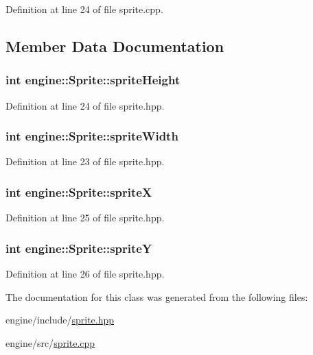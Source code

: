 Definition at line 24 of file sprite.\+cpp.



\subsection{Member Data Documentation}
\subsubsection[{\texorpdfstring{sprite\+Height}{spriteHeight}}]{\setlength{\rightskip}{0pt plus 5cm}int engine\+::\+Sprite\+::sprite\+Height}\hypertarget{classengine_1_1_sprite_a535447d266fb4582b772f5277ae02f3a}{}\label{classengine_1_1_sprite_a535447d266fb4582b772f5277ae02f3a}


Definition at line 24 of file sprite.\+hpp.

\subsubsection[{\texorpdfstring{sprite\+Width}{spriteWidth}}]{\setlength{\rightskip}{0pt plus 5cm}int engine\+::\+Sprite\+::sprite\+Width}\hypertarget{classengine_1_1_sprite_a6bf325695b8242a3e3a5844a13ca4405}{}\label{classengine_1_1_sprite_a6bf325695b8242a3e3a5844a13ca4405}


Definition at line 23 of file sprite.\+hpp.

\subsubsection[{\texorpdfstring{spriteX}{spriteX}}]{\setlength{\rightskip}{0pt plus 5cm}int engine\+::\+Sprite\+::spriteX}\hypertarget{classengine_1_1_sprite_ad3676fe88266289405966233c7990d33}{}\label{classengine_1_1_sprite_ad3676fe88266289405966233c7990d33}


Definition at line 25 of file sprite.\+hpp.

\subsubsection[{\texorpdfstring{spriteY}{spriteY}}]{\setlength{\rightskip}{0pt plus 5cm}int engine\+::\+Sprite\+::spriteY}\hypertarget{classengine_1_1_sprite_a5726d051f7f84fbffb8a74792a3f02a1}{}\label{classengine_1_1_sprite_a5726d051f7f84fbffb8a74792a3f02a1}


Definition at line 26 of file sprite.\+hpp.



The documentation for this class was generated from the following files\+:\begin{DoxyCompactItemize}
\item 
engine/include/\hyperlink{sprite_8hpp}{sprite.\+hpp}\item 
engine/src/\hyperlink{sprite_8cpp}{sprite.\+cpp}\end{DoxyCompactItemize}

